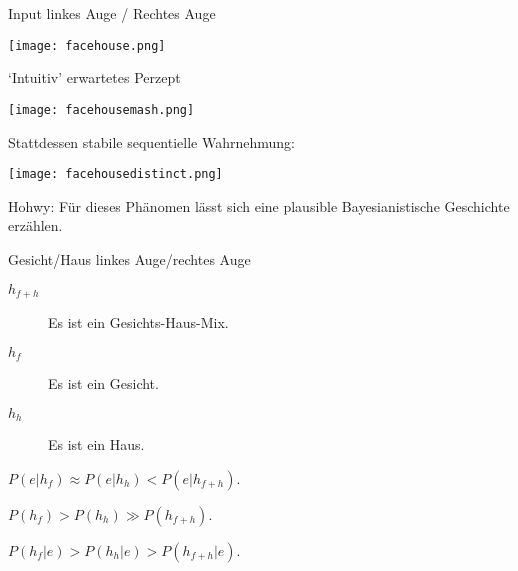 \documentclass[11pt, handout]{beamer}
\begin{document}
\begin{frame}

  Input linkes Auge / Rechtes Auge

  \begin{center}
    \texttt{[image: facehouse.png]}
  \end{center}
  `Intuitiv' erwartetes Perzept

  \begin{center}
    \texttt{[image: facehousemash.png]}
  \end{center}

  Stattdessen stabile sequentielle Wahrnehmung:
  \begin{center}
    \texttt{[image: facehousedistinct.png]}
  \end{center}
\end{frame}



\begin{frame}
  Hohwy: Für dieses Phänomen lässt sich eine plausible
  Bayesianistische Geschichte erzählen.

  \begin{description}[<+->]
  \item[Input]
    \begin{description}[<+->]
    \item[$e$] Gesicht/Haus linkes Auge/rechtes Auge

    \end{description}
  \item[Hypothesen]
    \begin{description}
    \item[$h_{f+h}$] Es ist ein Gesichts-Haus-Mix.
    \item[$h_f$] Es ist ein Gesicht.
    \item[$h_h$] Es ist ein Haus.
    \end{description}
  \item[Likelihoods] $P(e|h_f) \approx P(e|h_h) < P(e|h_{f+h})$.
  \item[Priors] $P(h_f) > P(h_h) \gg P(h_{f+h})$.
  \end{description}

  \begin{description}[<+->]
  \item[Posteriors] $P(h_f|e) > P(h_h|e) > P(h_{f+h}|e)$.
  \end{description}



\end{frame}
\end{document}
